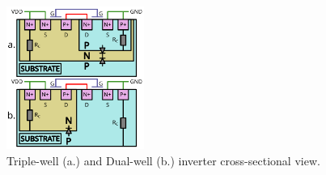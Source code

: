 
\begin{figure}[h]
	\label{fig_sub}
	\centering
	\includegraphics[width=0.4\textwidth]{./figures/substrate_2.pdf}
	\caption{Triple-well (a.) and Dual-well (b.) inverter cross-sectional view.}
\end{figure}
